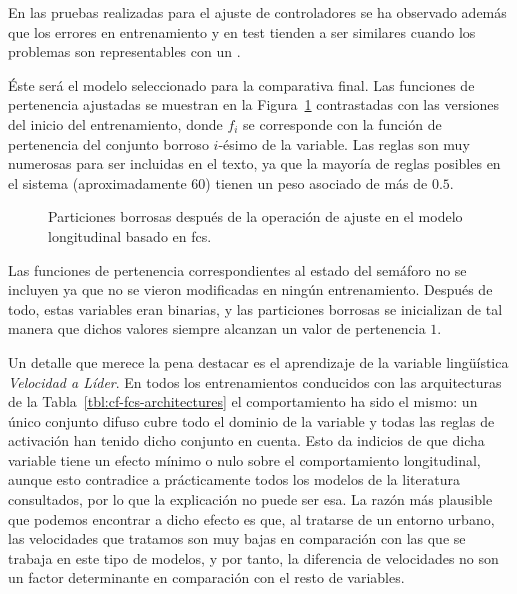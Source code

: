 En las pruebas realizadas para el ajuste de controladores se ha observado además que los errores en entrenamiento y en test tienden a ser similares cuando los problemas son representables con un .

Éste será el modelo seleccionado para la comparativa final. Las funciones de pertenencia ajustadas se muestran en la Figura~\ref{fig:adjusted-fuzzy-partitions} contrastadas con las versiones del inicio del entrenamiento, donde $f_i$ se corresponde con la función de pertenencia del conjunto borroso $i$-ésimo de la variable. Las reglas son muy numerosas para ser incluidas en el texto, ya que la mayoría de reglas posibles en el sistema (aproximadamente $60$) tienen un peso asociado de más de $0.5$.

\begin{figure}
	\centering
	\qquad
	\qquad
	\qquad
	\caption[Particiones borrosas después de la operación de ajuste en el modelo longitudinal basado en \acrshort{fcs}]{Particiones borrosas después de la operación de ajuste en el modelo longitudinal basado en \acrshort{fcs}.}
	\label{fig:adjusted-fuzzy-partitions}
\end{figure}

Las funciones de pertenencia correspondientes al estado del semáforo no se incluyen ya que no se vieron modificadas en ningún entrenamiento. Después de todo, estas variables eran binarias, y las particiones borrosas se inicializan de tal manera que dichos valores siempre alcanzan un valor de pertenencia $1$.

Un detalle que merece la pena destacar es el aprendizaje de la variable lingüística \textit{Velocidad a Líder}. En todos los entrenamientos conducidos con las arquitecturas de la Tabla~\ref{tbl:cf-fcs-architectures} el comportamiento ha sido el mismo: un único conjunto difuso cubre todo el dominio de la variable y todas las reglas de activación han tenido dicho conjunto en cuenta. Esto da indicios de que dicha variable tiene un efecto mínimo o nulo sobre el comportamiento longitudinal, aunque esto contradice a prácticamente todos los modelos de la literatura consultados, por lo que la explicación no puede ser esa. La razón más plausible que podemos encontrar a dicho efecto es que, al tratarse de un entorno urbano, las velocidades que tratamos son muy bajas en comparación con las que se trabaja en este tipo de modelos, y por tanto, la diferencia de velocidades no son un factor determinante en comparación con el resto de variables.

